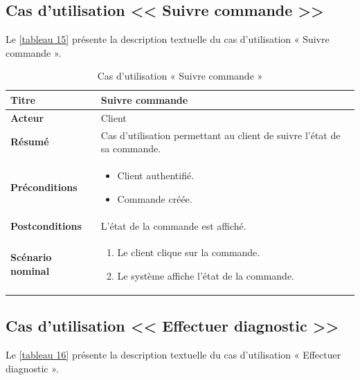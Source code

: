 \subsection{Cas d'utilisation << Suivre commande >>}

Le \autoref{tableau 15} présente la description textuelle du cas d'utilisation « Suivre commande ».

\begin{table}[H]
\centering
\renewcommand{\arraystretch}{1.4}
\begin{tabular}{|p{4cm}|p{10cm}|}
\hline
\textbf{Titre} & Suivre commande \\
\hline
\textbf{Acteur} & Client \\
\hline
\textbf{Résumé} & Cas d'utilisation permettant au client de suivre l'état de sa commande. \\
\hline
\textbf{Préconditions} &
\vspace{-12pt}
\begin{itemize}
    \item Client authentifié.
    \item Commande créée.
\end{itemize} \\
\hline
\textbf{Postconditions} & L'état de la commande est affiché. \\
\hline
\textbf{Scénario nominal} &
\vspace{-12pt}
\begin{enumerate}
    \item Le client clique sur la commande.
    \item Le système affiche l'état de la commande.
\end{enumerate} \\
\hline
\end{tabular}
\caption{Cas d'utilisation « Suivre commande »}
\label{tableau 15}
\end{table}

\subsection{Cas d'utilisation << Effectuer diagnostic >>}

Le \autoref{tableau 16} présente la description textuelle du cas d'utilisation « Effectuer diagnostic ».

